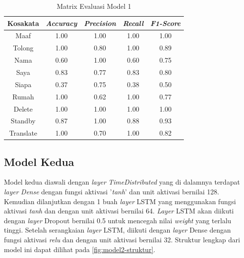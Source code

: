 \begin{longtable}{|c|c|c|c|c|}
  \caption{Matrix Evaluasi Model 1}
  \label{tb:model1stat}                                   \\
  \hline
  \rowcolor[HTML]{C0C0C0}
  \textbf{Kosakata} & \textbf{\emph{Accuracy}} & \textbf{\emph{Precision}} & \textbf{\emph{Recall}} & \textbf{\emph{F1-Score}} \\
  \hline
  Maaf              & 1.00                     & 1.00                        & 1.00                   & 1.00                \\
  Tolong            & 1.00                     & 0.80                        & 1.00                   & 0.89                \\
  Nama              & 0.60                     & 1.00                        & 0.60                   & 0.75                \\
  Saya              & 0.83                     & 0.77                        & 0.83                   & 0.80                \\
  Siapa             & 0.37                     & 0.75                        & 0.38                   & 0.50                \\
  Rumah             & 1.00                     & 0.62                        & 1.00                   & 0.77                \\
  Delete            & 1.00                     & 1.00                        & 1.00                   & 1.00                \\
  Standby           & 0.87                     & 1.00                        & 0.88                   & 0.93                \\
  Translate         & 1.00                     & 0.70                        & 1.00                   & 0.82                \\
  \hline
\end{longtable}

\subsection{Model Kedua}
\label{sec:analisismodel2}

Model kedua diawali dengan \emph{layer} \textit{TimeDistributed} yang di dalamnya terdapat \emph{layer} \textit{Dense} dengan fungsi aktivasi '\textit{tanh}' dan unit aktivasi bernilai 128. Kemudian dilanjutkan dengan 1 buah \emph{layer} LSTM yang menggunakan fungsi aktivasi \emph{tanh} dan dengan unit aktivasi bernilai 64. \emph{Layer} LSTM akan diikuti dengan \emph{layer} Dropout bernilai 0.5 untuk mencegah nilai \emph{weight} yang terlalu tinggi. Setelah serangkaian \emph{layer} LSTM, diikuti dengan \emph{layer} Dense dengan fungsi aktivasi \emph{relu} dan dengan unit aktivasi bernilai 32. Struktur lengkap dari model ini dapat dilihat pada \ref{fig:model2-struktur}.

